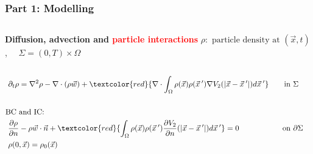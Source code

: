 \documentclass[aspectratio=169,xcolor=dvipsnames]{beamer}
\begin{document}
\begin{frame}
	\frametitle{Part 1: Modelling}
	\begin{columns}
		\textbf{Diffusion, advection and \textcolor{red}{particle interactions}}
		$	\rho: \text{ particle density at } (\vec{x},t)$, 
		$\quad \Sigma = (0,T) \times \Omega$
		\begin{align*}
		\\
		\partial_t \rho &= \nabla^2 \rho - \nabla \cdot (\rho \vec{w}) +\textcolor{red}{ \nabla \cdot \int_\Omega \rho(\vec{x}) \rho(\vec{x}\hspace{0.2em}') \nabla V_2(|\vec{x}-\vec{x}\hspace{0.2em}'|)d\vec{x}\hspace{0.2em}'} \qquad\text{in    } \Sigma\\
		\\
		\text{BC }& \text{and IC:}\\
		\frac{\partial \rho}{\partial n}& - \rho \vec{w} \cdot \vec{n} +\textcolor{red}{ \int_\Omega \rho(\vec{x}) \rho(\vec{x}\hspace{0.2em}')  \frac{ \partial  V_2}{\partial n}(|\vec{x}-\vec{x}\hspace{0.2em}'|)d\vec{x}\hspace{0.2em}'} = 0 \quad\ \ \qquad \qquad\text{on   } \partial \Sigma   \\
		\rho(0&,\vec{x}) = \rho_0(\vec{x}) 
		\end{align*}
		\vspace{-1cm}
		\begin{figure}
			\includegraphics[width=3cm]{bloodcells.jpg}\\
			\includegraphics[width=3cm]{bacteria.png}\\
			\includegraphics[width=3cm]{Microfilter.png}\\
			\includegraphics[width=3cm]{beer.png}
		\end{figure}
	\end{columns}
\end{frame}
\end{document}
